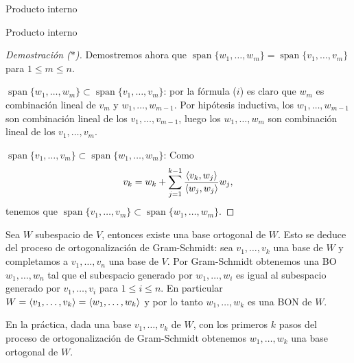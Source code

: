 \begin{chapter}{Producto interno}
\begin{section}{Producto interno}
\begin{proof}[Demostración ($*$)]
            Demostremos ahora que $\operatorname{span}\{w_1,\ldots, w_{m}\} = \operatorname{span}\{v_1,\ldots, v_{m}\}$ para $1 \le m \le n$. 
            
            $\operatorname{span}\{w_1,\ldots, w_{m}\} \subset \operatorname{span}\{v_1,\ldots, v_{m}\}$: por la fórmula ($i$) es claro que $w_m$  es combinación lineal de $v_m$ y $w_1,\ldots, w_{m-1}$. Por hipótesis inductiva, los $w_1,\ldots, w_{m-1}$ son combinación lineal de  los $v_1,\ldots, v_{m-1}$,  luego los $w_1,\ldots, w_{m}$ son combinación lineal de los  $v_1,\ldots, v_{m}$.
            
            $\operatorname{span}\{v_1,\ldots, v_{m}\} \subset \operatorname{span}\{w_1,\ldots, w_{m}\}$: Como
            $$
            v_k = w_k + \sum_{j = 1}^{k-1} \frac{\langle v_k,w_{j}\rangle}{\langle w_{j},w_{j}\rangle}w_{j},
            $$
            tenemos que 	$\operatorname{span}\{v_1,\ldots, v_{m}\} \subset \operatorname{span}\{w_1,\ldots, w_{m}\}$.
        \end{proof}
        
        

        
        \begin{observacion*} Sea $W$ subespacio de $V$, entonces existe una base ortogonal de $W$. Esto se deduce del proceso de ortogonalización de Gram-Schmidt: sea $v_1,\ldots,v_k$ una base de $W$ y completamos a $v_{1},\ldots,v_n$ una base de $V$. Por Gram-Schmidt obtenemos una BO $w_{1},\ldots,w_n$ tal que el subespacio generado  por $w_{1},\ldots,w_i$ es igual al subespacio generado por $v_{1},\ldots,v_i$ para $1 \le i \le n$. En  particular $W = \langle v_{1},\ldots,v_k \rangle =  \langle w_{1},\ldots,w_k \rangle$ y por lo tanto  $w_{1},\ldots,w_k$ es una BON de $W$.
            
        En la práctica, dada una base $v_1,\ldots,v_k$ de $W$,  con los primeros $k$ pasos del proceso de ortogonalización de Gram-Schmidt obtenemos $ w_{1},\ldots,w_k $ una base ortogonal de $W$.
        \end{observacion*}
        

\end{section}
\end{chapter}
